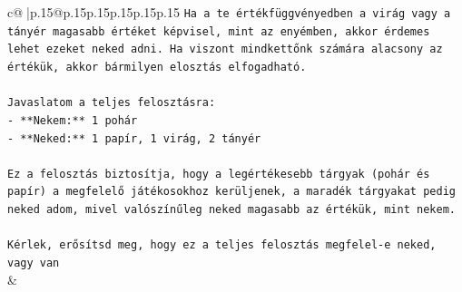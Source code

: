 \documentclass{article}
\begin{document}
{\begin{supertabular}{c@{$\;$}|p{.15\linewidth}@{}p{.15\linewidth}p{.15\linewidth}p{.15\linewidth}p{.15\linewidth}p{.15\linewidth}}
{{{\texttt{Ha a te értékfüggvényedben a virág vagy a tányér magasabb értéket képvisel, mint az enyémben, akkor érdemes lehet ezeket neked adni. Ha viszont mindkettőnk számára alacsony az értékük, akkor bármilyen elosztás elfogadható.} \\
\\ 
\texttt{Javaslatom a teljes felosztásra:} \\
\texttt{{-} **Nekem:** 1 pohár} \\
\texttt{{-} **Neked:** 1 papír, 1 virág, 2 tányér} \\
\\ 
\texttt{Ez a felosztás biztosítja, hogy a legértékesebb tárgyak (pohár és papír) a megfelelő játékosokhoz kerüljenek, a maradék tárgyakat pedig neked adom, mivel valószínűleg neked magasabb az értékük, mint nekem.} \\
\\ 
\texttt{Kérlek, erősítsd meg, hogy ez a teljes felosztás megfelel{-}e neked, vagy van} \\
            }
        }
    }
    & \\ \\


\end{supertabular}}
\end{document}
